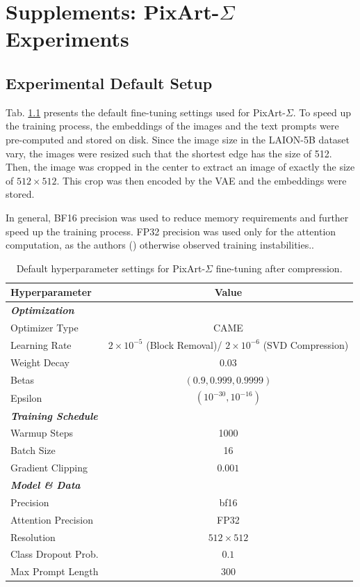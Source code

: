 \chapter{Supplements: PixArt-$\Sigma$ Experiments}

\section{Experimental Default Setup}
Tab. \ref{tab:hyperparameterTraining} presents the default fine-tuning settings used for PixArt-$\Sigma$. To speed up the training process, the embeddings of the images and the text prompts were pre-computed and stored on disk. Since the image size in the LAION-5B dataset vary, the images were resized such that the shortest edge has the size of 512. Then, the image was cropped in the center to extract an image of exactly the size of $512 \times 512$. This crop was then encoded by the \gls{VAE} and the embeddings were stored. 

In general, BF16 precision was used to reduce memory requirements and further speed up the training process. FP32 precision was used only for the attention computation, as the authors (\cite{Pixart_s}) otherwise observed training instabilities..

\begin{table}[H]
	\centering
	\caption[PixArt-$\Sigma$ Fine-Tuning Hyperparameters]{Default hyperparameter settings for PixArt-$\Sigma$ fine-tuning after compression.}
	\label{tab:hyperparameterTraining}
	\begin{tabular}{l c}
		\toprule
		\textbf{Hyperparameter} & \textbf{Value} \\
		\midrule
		\multicolumn{2}{l}{\textit{\textbf{Optimization}}} \\
		\midrule
		Optimizer Type & CAME \\
		Learning Rate & $2 \times 10^{-5}$ (Block Removal)/ $2 \times 10^{-6}$ (SVD Compression)\\
		Weight Decay & $0.03$ \\
		Betas & $(0.9, 0.999, 0.9999)$ \\
		Epsilon & $(10^{-30}, 10^{-16})$ \\
		\midrule
		\multicolumn{2}{l}{\textit{\textbf{Training Schedule}}} \\
		\midrule
		Warmup Steps & 1000 \\
		Batch Size & 16 \\
		Gradient Clipping & $0.001$ \\
		\midrule
		\multicolumn{2}{l}{\textit{\textbf{Model \& Data}}} \\
		\midrule
		Precision & bf16 \\
		Attention Precision & FP32 \\
		Resolution & $512 \times 512$ \\
		Class Dropout Prob. & $0.1$ \\
		Max Prompt Length & 300 \\
		\bottomrule
	\end{tabular}
\end{table}

